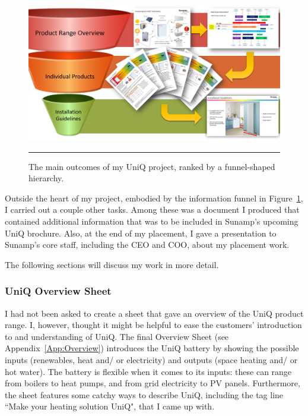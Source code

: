 \begin{figure}[htbp]
	\centering
	\includegraphics[width=\textwidth]{figures/Funnel.PNG}
	\rule{\textwidth}{0.5pt} %
	\caption{The main outcomes of my UniQ project, ranked by a funnel-shaped hierarchy.}
	\label{funnel}
\end{figure}


Outside the heart of my project, embodied by the information funnel in Figure~\ref{funnel}, I carried out a couple other tasks.
Among these was a document I produced that contained additional information that was to be included in Sunamp's upcoming UniQ brochure.
Also, at the end of my placement, I gave a presentation to Sunamp's core staff, including the CEO and COO, about my placement work.

The following sections will discuss my work in more detail.



\subsubsection{UniQ Overview Sheet}

I had not been asked to create a sheet that gave an overview of the UniQ product range.
I, however, thought it might be helpful to ease the customers' introduction to and understanding of UniQ.
The final Overview Sheet (see Appendix~\ref{App:Overview}) introduces the UniQ battery by showing the possible inputs (renewables, heat and/ or electricity) and outputs (space heating and/ or hot water).
The battery is flexible when it comes to its inputs: these can range from boilers to heat pumps, and from grid electricity to PV panels.
Furthermore, the sheet features some catchy ways to describe UniQ, including the tag line ``Make your heating solution UniQ", that I came up with.


